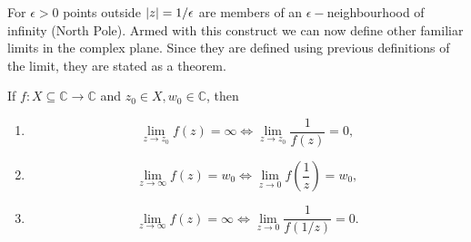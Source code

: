 \documentclass[12pt]{book}
\begin{document}
For $\epsilon > 0$ points outside $\left\lvert z \right\rvert = 1 / \epsilon$ are members of an $\epsilon-$neighbourhood of infinity (North Pole). Armed with this construct we can now define other familiar limits in the complex plane. Since they are defined using previous definitions of the limit, they are stated as a theorem.

\begin{thm}
    If $f: X \subseteq \mathbb{C} \rightarrow \mathbb{C}$ and $z_0 \in X, w_0 \in \mathbb{C}$, then 
    \begin{enumerate}[label = {(\roman*)}]
        \item
            $$
                \lim_{z \rightarrow z_0} f(z) = \infty \iff \lim_{z \rightarrow z_0} \frac{1}{f(z)} = 0,
            $$
        \item
            $$
                \lim_{z \rightarrow \infty} f(z) = w_0 \iff \lim_{z \rightarrow 0} f\left(\frac{1}{z}\right) = w_0,
            $$
        \item
            $$
                \lim_{z \rightarrow \infty} f(z) = \infty \iff \lim_{z \rightarrow 0} \frac{1}{f(1/z)} = 0.
            $$
    \end{enumerate}
\end{thm}
\end{document}
